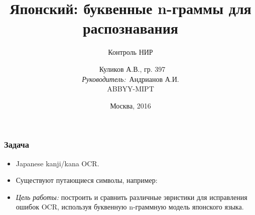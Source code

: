 \documentclass[14pt]{beamer}
\title{\small{Японский: буквенные n-граммы для распознавания}}
\subtitle{\footnotesize{Контроль НИР}}
\author{\small{%
~Куликов А.В., гр. 397\\%
\emph{Руководитель:}~Андрианов А.И.}\\%
\vspace{30pt}%
ABBYY-MIPT%
\vspace{20pt}%
}
\date{\small{Москва, 2016}}
\begin{document}
\maketitle

\begin{frame}

\frametitle{Задача}
\begin{itemize}
    \item Japanese kanji/kana OCR.
    \item Существуют путающиеся символы, например:
    \begin{figure}[h]
    \end{figure}
    \item \emph{Цель работы: } построить и сравнить различные эвристики для исправления ошибок OCR, используя буквенную n-граммную модель японского языка.
\end{itemize}
\end{frame}
\end{document}

